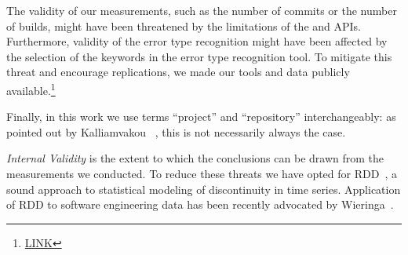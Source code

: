 The validity of our measurements, such as the number of commits or the 
number of builds, might have been threatened by the limitations of the \GH 
and \Tvis APIs.
Furthermore, validity of the error type recognition might have been affected 
by the selection of the keywords in the error type recognition tool. 
To mitigate this threat and encourage replications, we made our tools 
and data publicly available.\footnote{\url{LINK}}

Finally, in this work we use terms ``project'' and ``repository'' interchangeably: 
as pointed out by Kalliamvakou \etal~\cite{Kalliamvakou2014Promises}, this is 
not necessarily always the case. 


\smallskip \emph{Internal Validity} is the extent to which the conclusions can 
be drawn from the measurements we conducted. 
To reduce these threats we have opted for RDD~\cite{imbens2008regression}, 
a sound approach to statistical modeling of discontinuity in time series. 
Application of RDD to software engineering data has been recently advocated 
by Wieringa~\cite{Wieringa}.
 
